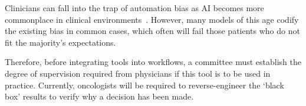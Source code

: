 \documentclass[12pt,twoside]{report}
\begin{document}
Clinicians can fall into the trap of automation bias as AI becomes more commonplace in clinical environments~\cite{STRAW2020101965}. However, many models of this age codify the existing bias in common cases, which often will fail those patients who do not fit the majority's expectations. 

Therefore, before integrating tools into workflows, a committee must establish the degree of supervision required from physicians if this tool is to be used in practice. Currently, oncologists will be required to reverse-engineer the `black box' results to verify why a decision has been made. 



\end{document}
